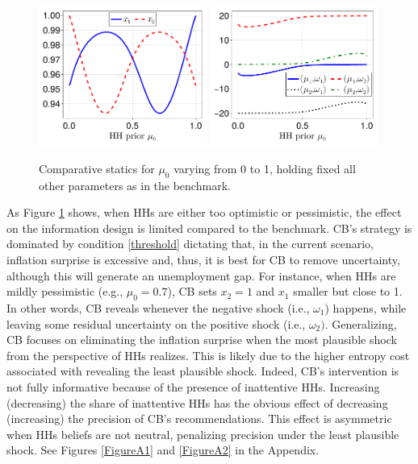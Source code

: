 \documentclass[12pt,a4paper]{article}
\begin{document}
\begin{figure}[H]
\centering
\includegraphics[width=0.49\textwidth]{figures/V11/γ=10.0-μ_0=0.5-α=1.0-θ=1.0/communication/fig_optimal_x_by_μ_0.pdf}
\includegraphics[width=0.49\textwidth]{figures/V11/γ=10.0-μ_0=0.5-α=1.0-θ=1.0/communication/fig_optimal_γ_by_μ_0.pdf}
\caption{Comparative statics for $\mu_0$ varying from 0 to 1, holding fixed all other parameters as in the benchmark.}
\label{Figure1}
\end{figure}

As Figure \ref{Figure1} shows, when HHs are either too optimistic or pessimistic, the effect on the information design is limited compared to the benchmark. CB's strategy is dominated by condition \eqref{threshold} dictating that, in the current scenario, inflation surprise is excessive and, thus, it is best for CB to remove uncertainty, although this will generate an unemployment gap. For instance, when HHs are mildly pessimistic (e.g., $\mu_0=0.7$), CB sets $x_2=1$ and $x_1$ smaller but close to 1. In other words, CB reveals whenever the negative shock (i.e., $\omega_1$) happens, while leaving some residual uncertainty on the positive shock (i.e., $\omega_2)$. Generalizing, CB focuses on eliminating the inflation surprise when the most plausible shock from the perspective of HHs realizes. This is likely due to the higher entropy cost associated with revealing the least plausible shock. Indeed, CB's intervention is not fully informative because of the presence of inattentive HHs. Increasing (decreasing) the share of inattentive HHs has the obvious effect of decreasing (increasing) the precision of CB's recommendations. This effect is asymmetric when HHs beliefs are not neutral, penalizing precision under the least plausible shock. See Figures \ref{FigureA1} and \ref{FigureA2} in the Appendix.
\end{document}
